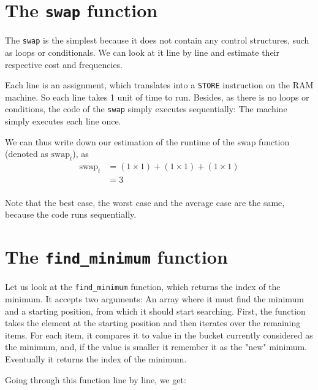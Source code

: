 \documentclass[11pt]{article}
\begin{document}
\section{The \texttt{swap} function}
\label{sec:org551510c}

The \texttt{swap} is the simplest because it does not contain any control
structures, such as loops or conditionals. We can look at it line by
line and estimate their respective cost and frequencies.

Each line is an assignment, which translates into a \texttt{STORE}
instruction on the RAM machine. So each line takes 1 unit of time to
run. Besides, as there is no loops or conditions, the code of the
\texttt{swap} simply executes sequentially: The machine simply executes
each line once.

We can thus write down our estimation of the runtime of the swap
function (denoted as \(\text{swap}_t\)), as
\begin{align*}
  \text{swap}_t &= (1 \times 1) + (1 \times 1) + (1 \times 1) \\
                &= 3 \\
\end{align*}

Note that the best case, the worst case and the average case are the
same, because the code runs sequentially.

\section{The \texttt{find\_minimum} function}
\label{sec:org1318736}

Let us look at the \texttt{find\_minimum} function, which returns the index
of the minimum. It accepts two arguments: An array where it must
find the minimum and a starting position, from which it should start
searching. First, the function takes the element at the starting
position and then iterates over the remaining items. For each item,
it compares it to value in the bucket currently considered as the
minimum, and, if the value is smaller it remember it as the "new"
minimum. Eventually it returns the index of the minimum.

Going through this function line by line, we get:
\end{document}
